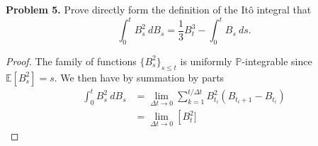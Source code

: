 \documentclass[11pt,letterpaper]{report}
\newcommand{\E}{\mathbb{E}}
\newcommand{\Prob}{\mathbb{P}}
\begin{document}
\noindent\textbf{Problem 5. }
Prove directly form the definition of the It\^o integral that
\[
\int_0^tB_s^2\ dB_s = \frac{1}{3}B_t^3 - \int_0^tB_s\ ds.
\]
\begin{proof}
	The family of functions $\{B_s^2\}_{s\leq t}$ is uniformly $\Prob$-integrable since $\E[B_s^2] = s$. We then have by summation by parts
	\begin{align*}
		\int_0^tB_s^2\ dB_s &= \lim_{\Delta t\to 0}\sum_{k=1}^{t/\Delta t}B_{t_i}^2(B_{t_i+1}-B_{t_i})\\
		&= \lim_{\Delta t\to 0}\left[B_t^2]
	\end{align*}
\end{proof}
\end{document}
